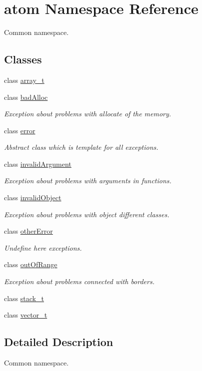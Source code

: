\hypertarget{namespaceatom}{}\section{atom Namespace Reference}
\label{namespaceatom}


Common namespace.  


\subsection*{Classes}
\begin{DoxyCompactItemize}
\item 
class \hyperlink{classatom_1_1array__t}{array\+\_\+t}
\item 
class \hyperlink{classatom_1_1bad_alloc}{bad\+Alloc}
\begin{DoxyCompactList}\small\item\em Exception about problems with allocate of the memory. \end{DoxyCompactList}\item 
class \hyperlink{classatom_1_1error}{error}
\begin{DoxyCompactList}\small\item\em Abstract class which is template for all exceptions. \end{DoxyCompactList}\item 
class \hyperlink{classatom_1_1invalid_argument}{invalid\+Argument}
\begin{DoxyCompactList}\small\item\em Exception about problems with arguments in functions. \end{DoxyCompactList}\item 
class \hyperlink{classatom_1_1invalid_object}{invalid\+Object}
\begin{DoxyCompactList}\small\item\em Exception about problems with object different classes. \end{DoxyCompactList}\item 
class \hyperlink{classatom_1_1other_error}{other\+Error}
\begin{DoxyCompactList}\small\item\em Undefine here exceptions. \end{DoxyCompactList}\item 
class \hyperlink{classatom_1_1out_of_range}{out\+Of\+Range}
\begin{DoxyCompactList}\small\item\em Exception about problems connected with borders. \end{DoxyCompactList}\item 
class \hyperlink{classatom_1_1stack__t}{stack\+\_\+t}
\item 
class \hyperlink{classatom_1_1vector__t}{vector\+\_\+t}
\end{DoxyCompactItemize}


\subsection{Detailed Description}
Common namespace. 